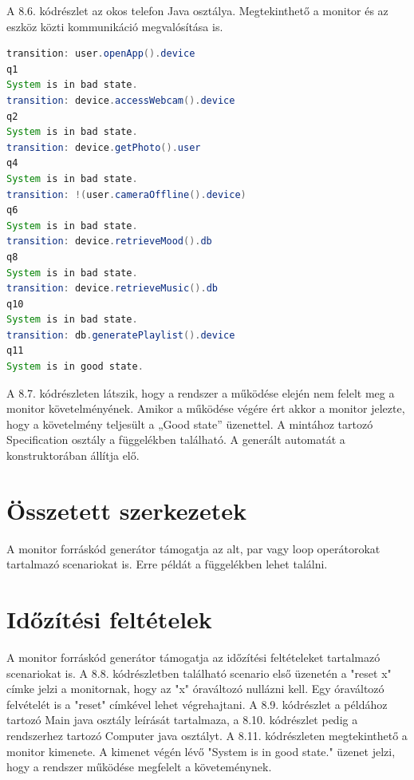 A 8.6. kódrészlet az okos telefon Java osztálya.
Megtekinthető a monitor és az eszköz közti kommunikáció megvalósítása is.

\begin{lstlisting}[language=java, frame=single, float=ht!, caption={Monitor kimenete a rendszer működésének egyes fázisaiban.},captionpos=b]
transition: user.openApp().device
q1
System is in bad state.
transition: device.accessWebcam().device
q2
System is in bad state.
transition: device.getPhoto().user
q4
System is in bad state.
transition: !(user.cameraOffline().device)
q6
System is in bad state.
transition: device.retrieveMood().db
q8
System is in bad state.
transition: device.retrieveMusic().db
q10
System is in bad state.
transition: db.generatePlaylist().device
q11
System is in good state.
\end{lstlisting}

A 8.7. kódrészleten látszik, hogy a rendszer a működése elején nem felelt meg a monitor követelményének.
Amikor a működése végére ért akkor a monitor jelezte, hogy a követelmény teljesült a „Good state” üzenettel.
A mintához tartozó Specification osztály a függelékben található.
A generált automatát a konstruktorában állítja elő.

\section{Összetett szerkezetek}

A monitor forráskód generátor támogatja az alt, par vagy loop operátorokat tartalmazó scenariokat is.
Erre példát a függelékben lehet találni.

\clearpage\section{Időzítési feltételek}

A monitor forráskód generátor támogatja az időzítési feltételeket tartalmazó scenariokat is.
A 8.8. kódrészletben található scenario első üzenetén a "reset x" címke jelzi a monitornak, hogy az "x" óraváltozó nullázni kell.
Egy óraváltozó felvételét is a "reset" címkével lehet végrehajtani.
A 8.9. kódrészlet a példához tartozó Main java osztály leírását tartalmaza, a 8.10. kódrészlet pedig a rendszerhez tartozó Computer java osztályt.
A 8.11. kódrészleten megtekinthető a monitor kimenete.
A kimenet végén lévő "System is in good state." üzenet jelzi, hogy a rendszer működése megfelelt a követeménynek.


